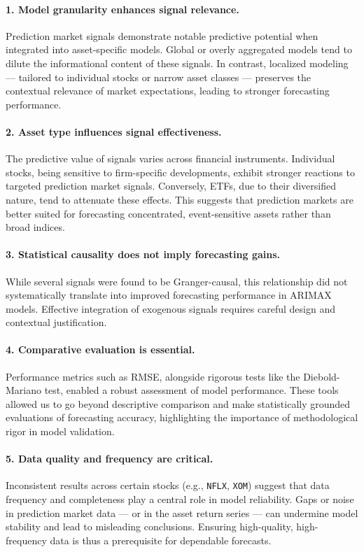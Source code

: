 \documentclass[12pt]{report}
\begin{document}
\paragraph{1. Model granularity enhances signal relevance.}
Prediction market signals demonstrate notable predictive potential when integrated into asset-specific models. Global or overly aggregated models tend to dilute the informational content of these signals. In contrast, localized modeling — tailored to individual stocks or narrow asset classes — preserves the contextual relevance of market expectations, leading to stronger forecasting performance.

\paragraph{2. Asset type influences signal effectiveness.}
The predictive value of signals varies across financial instruments. Individual stocks, being sensitive to firm-specific developments, exhibit stronger reactions to targeted prediction market signals. Conversely, ETFs, due to their diversified nature, tend to attenuate these effects. This suggests that prediction markets are better suited for forecasting concentrated, event-sensitive assets rather than broad indices.

\paragraph{3. Statistical causality does not imply forecasting gains.}
While several signals were found to be Granger-causal, this relationship did not systematically translate into improved forecasting performance in ARIMAX models. Effective integration of exogenous signals requires careful design and contextual justification.

\paragraph{4. Comparative evaluation is essential.}
Performance metrics such as RMSE, alongside rigorous tests like the Diebold-Mariano test, enabled a robust assessment of model performance. These tools allowed us to go beyond descriptive comparison and make statistically grounded evaluations of forecasting accuracy, highlighting the importance of methodological rigor in model validation.

\paragraph{5. Data quality and frequency are critical.}
Inconsistent results across certain stocks (e.g., \texttt{NFLX}, \texttt{XOM}) suggest that data frequency and completeness play a central role in model reliability. Gaps or noise in prediction market data — or in the asset return series — can undermine model stability and lead to misleading conclusions. Ensuring high-quality, high-frequency data is thus a prerequisite for dependable forecasts.
\end{document}
